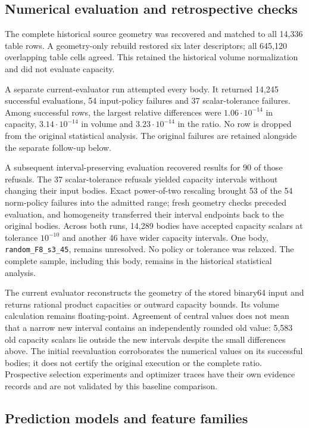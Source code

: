 \subsection{Numerical evaluation and retrospective checks}\label{app:ds-evaluation}

The complete historical source geometry was recovered and matched to all
14,336 table rows. A geometry-only rebuild restored six later descriptors;
all 645,120 overlapping table cells agreed. This retained the historical
volume normalization and did not evaluate capacity.

A separate current-evaluator run attempted every body. It returned 14,245
successful evaluations, 54 input-policy failures and 37 scalar-tolerance
failures. Among successful rows, the largest relative differences were
$1.06\cdot10^{-14}$ in capacity, $3.14\cdot10^{-14}$ in volume and
$3.23\cdot10^{-14}$ in the ratio. No row is dropped from the original
statistical analysis. The original failures are retained alongside the separate follow-up below.

A subsequent interval-preserving evaluation recovered results for 90 of
those refusals. The 37 scalar-tolerance refusals yielded capacity intervals
without changing their input bodies. Exact power-of-two rescaling brought
53 of the 54 norm-policy failures into the admitted range; fresh geometry
checks preceded evaluation, and homogeneity transferred their interval
endpoints back to the original bodies. Across both runs, 14,289 bodies have
accepted capacity scalars at tolerance $10^{-10}$ and another 46 have wider
capacity intervals. One body, \texttt{random\_F8\_s3\_45}, remains unresolved.
No policy or tolerance was relaxed. The complete sample, including this
body, remains in the historical statistical analysis.

The current evaluator reconstructs the geometry of the stored binary64 input
and returns rational product capacities or outward capacity bounds. Its
volume calculation remains floating-point. Agreement of central values does
not mean that a narrow new interval contains an independently rounded old
value: 5,583 old capacity scalars lie outside the new intervals despite the
small differences above. The initial reevaluation corroborates the numerical values
on its successful bodies; it does not certify the original execution or the
complete ratio. Prospective selection experiments and optimizer traces have
their own evidence records and are not validated by this baseline comparison.

\subsection{Prediction models and feature families}\label{app:ds-prediction}


